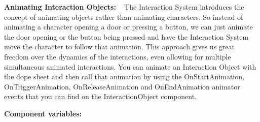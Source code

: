 {\bfseries Animating Interaction Objects\+:} ~\newline
 The Interaction System introduces the concept of animating objects rather than animating characters. So instead of animating a character opening a door or pressing a button, we can just animate the door opening or the button being pressed and have the Interaction System move the character to follow that animation. This approach gives us great freedom over the dynamics of the interactions, even allowing for multiple simultaneous animated interactions. You can animate an Interaction Object with the dope sheet and then call that animation by using the On\+Start\+Animation, On\+Trigger\+Animation, On\+Release\+Animation and On\+End\+Animation animator events that you can find on the Interaction\+Object component.

{\bfseries Component variables\+:}
